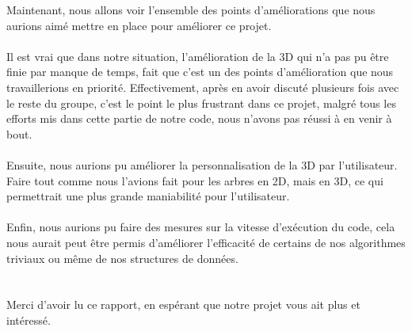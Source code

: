 \documentclass[a4paper,12pt]{article}
\begin{document}
Maintenant, nous allons voir l'ensemble des points d'améliorations que nous aurions aimé mettre en place pour améliorer ce projet.
\\\\
Il est vrai que dans notre situation, l'amélioration de la 3D qui n'a pas pu être finie par manque de temps, fait que c'est un des points d'amélioration que nous travaillerions en priorité. Effectivement, après en avoir discuté plusieurs fois avec le reste du groupe, c'est le point le plus frustrant dans ce projet, malgré tous les efforts mis dans cette partie de notre code, nous n'avons pas réussi à en venir à bout.
\\\\
Ensuite, nous aurions pu améliorer la personnalisation de la 3D par l'utilisateur. Faire tout comme nous l'avions fait pour les arbres en 2D, mais en 3D, ce qui permettrait une plus grande maniabilité pour l'utilisateur.
\\\\
Enfin, nous aurions pu faire des mesures sur la vitesse d'exécution du code, cela nous aurait peut être permis d'améliorer l'efficacité de certains de nos algorithmes triviaux ou même de nos structures de données.
\\\\\\
Merci d'avoir lu ce rapport, en espérant que notre projet vous ait plus et intéressé. 
\end{document}
